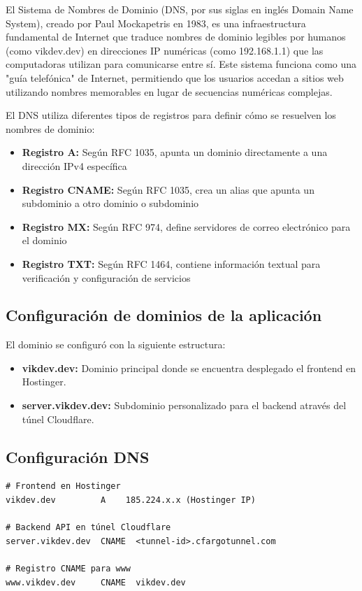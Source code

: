 \documentclass[12pt,a4paper]{report}
\begin{document}
El Sistema de Nombres de Dominio (DNS, por sus siglas en inglés Domain Name System), creado por Paul Mockapetris en 1983, es una infraestructura fundamental de Internet que traduce nombres de dominio legibles por humanos (como vikdev.dev) en direcciones IP numéricas (como 192.168.1.1) que las computadoras utilizan para comunicarse entre sí. Este sistema funciona como una "guía telefónica" de Internet, permitiendo que los usuarios accedan a sitios web utilizando nombres memorables en lugar de secuencias numéricas complejas.

El DNS utiliza diferentes tipos de registros para definir cómo se resuelven los nombres de dominio:
\begin{itemize}
\item \textbf{Registro A:} Según RFC 1035, apunta un dominio directamente a una dirección IPv4 específica
\item \textbf{Registro CNAME:} Según RFC 1035, crea un alias que apunta un subdominio a otro dominio o subdominio
\item \textbf{Registro MX:} Según RFC 974, define servidores de correo electrónico para el dominio
\item \textbf{Registro TXT:} Según RFC 1464, contiene información textual para verificación y configuración de servicios
\end{itemize}

\subsection{Configuración de dominios de la aplicación}

El dominio se configuró con la siguiente estructura:

\begin{itemize}
\item \textbf{vikdev.dev:} Dominio principal donde se encuentra desplegado el frontend en Hostinger.
\item \textbf{server.vikdev.dev:} Subdominio personalizado para el backend através del túnel Cloudflare.
\end{itemize}

\subsection{Configuración DNS}

\begin{lstlisting}[language=text, caption=Configuración de dominios]
# Frontend en Hostinger
vikdev.dev         A    185.224.x.x (Hostinger IP)

# Backend API en túnel Cloudflare  
server.vikdev.dev  CNAME  <tunnel-id>.cfargotunnel.com

# Registro CNAME para www
www.vikdev.dev     CNAME  vikdev.dev
\end{lstlisting}
\end{document}
